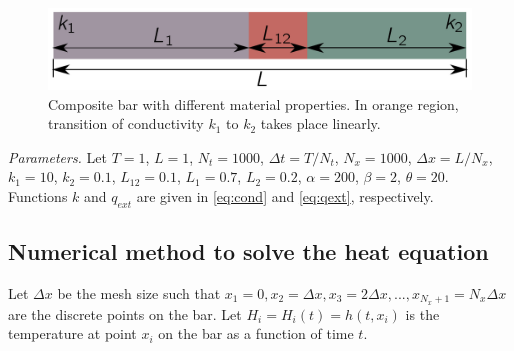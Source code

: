 \documentclass[11pt,a4paper]{article}
\begin{document}
\begin{figure}
\centering
\includegraphics[width=0.7\linewidth]{bar}
\caption{Composite bar with different material properties. In orange region, transition of conductivity $k_1$ to $k_2$ takes place linearly.}
\label{fig:bar}
\end{figure}

\vspace{10pt}
\noindent\textit{Parameters.} Let $T = 1$, $L = 1$, $N_t = 1000$, $\Delta t = T/ N_t$, $N_x = 1000$, $\Delta x = L /N_x$, $k_1 = 10$, $k_2 = 0.1$, $L_{12} = 0.1$, $L_1 = 0.7$, $L_2 = 0.2$, $\alpha = 200$, $\beta = 2$, $\theta = 20$. Functions $k$ and $q_{ext}$ are given in \eqref{eq:cond} and \eqref{eq:qext}, respectively.  

\subsection{Numerical method to solve the heat equation}
Let $\Delta x$ be the mesh size such that $x_1 = 0, x_2 = \Delta x, x_3 = 2\Delta x, ..., x_{N_x + 1} = N_x \Delta x$ are the discrete points on the bar. Let $H_i = H_i(t) = h(t, x_i)$ is the temperature at point $x_i$ on the bar as a function of time $t$. 
\end{document}
